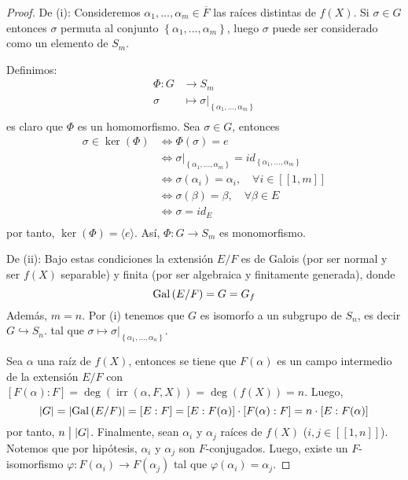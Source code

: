 \documentclass[12pt]{report}
\theoremstyle{largebreak}
\newcommand\abs[1]{\ensuremath{\left|#1\right|}}
\newcommand\divides{\ensuremath{\bigm|}}
\newcommand\cf[3]{\ensuremath{#1:#2\rightarrow#3}}
\newcommand\natint[1]{\ensuremath{\left[\!\left[ #1\right]\!\right]}}
\DeclareMathOperator{\irr}{irr}
\begin{document}
    \begin{proof}
        De (i): Consideremos $\alpha_1,...,\alpha_m\in\overline{F}$ las raíces distintas de $f(X)$. Si $\sigma\in G$ entonces $\sigma$ permuta al conjunto $\left\{\alpha_1,...,\alpha_m\right\}$, luego $\sigma$ puede ser considerado como un elemento de $S_m$.

        Definimos:
        \begin{equation*}
            \begin{split}
                \Phi:G&\rightarrow S_m\\
                \sigma&\mapsto \sigma\big|_{\left\{\alpha_1,...,\alpha_m\right\}}\\
            \end{split}
        \end{equation*}
        es claro que $\Phi$ es un homomorfismo. Sea $\sigma\in G$, entonces
        \begin{equation*}
            \begin{split}
                \sigma\in\ker(\Phi)&\iff\Phi(\sigma)=e \\
                &\iff\sigma\big|_{\left\{\alpha_1,...,\alpha_m\right\}}=id_{\left\{\alpha_1,...,\alpha_m\right\} } \\
                &\iff \sigma(\alpha_i)=\alpha_i,\quad\forall i\in\natint{1,m}\\
                &\iff \sigma(\beta)=\beta,\quad\forall \beta\in E\\
                &\iff \sigma=id_E\\
            \end{split}
        \end{equation*}
        por tanto, $\ker(\Phi)=\langle e\rangle$. Así, $\cf{\Phi}{G}{S_m}$ es monomorfismo.

        De (ii): Bajo estas condiciones la extensión $E/F$ es de Galois (por ser normal y ser $f(X)$ separable) y finita (por ser algebraica y finitamente generada), donde
        \begin{equation*}
            \textup{Gal}\left(E/F\right)=G=G_f
        \end{equation*}
        Además, $m=n$. Por (i) tenemos que $G$ es isomorfo a un subgrupo de $S_n$, es decir $G\hookrightarrow S_n$. tal que $\sigma\mapsto\sigma\big|_{\left\{\alpha_1,...,\alpha_n\right\}}$.

        Sea $\alpha$ una raíz de $f(X)$, entonces se tiene que $F(\alpha)$ es un campo intermedio de la extensión $E/F$ con $[F(\alpha):F]=\deg(\irr(\alpha,F,X))=\deg(f(X))=n$. Luego,
        \begin{equation*}
            \abs{G}=\abs{\Gal{E/F}}=[E:F]=[E:F(\alpha)]\cdot[F(\alpha):F]=n\cdot[E:F(\alpha)]
        \end{equation*}
        por tanto, $n\divides\abs{G}$. Finalmente, sean $\alpha_i$ y $\alpha_j$ raíces de $f(X)$ ($i,j\in\natint{1,n}$). Notemos que por hipótesis, $\alpha_i$ y $\alpha_j$ son $F$-conjugados. Luego, existe un $F$-isomorfismo $\cf{\varphi}{F(\alpha_i)}{F(\alpha_j)}$ tal que $\varphi(\alpha_i)=\alpha_j$.


\end{proof}
\end{document}
